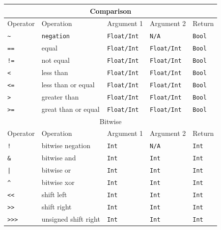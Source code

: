 \documentclass{article}
\newcommand{\type}[1]{\texttt{#1}}
\newcommand{\expr}[1]{\texttt{#1}}
\begin{document}
\begin{center}
\begin{tabular}{| l | l | l | l | l |}
	\multicolumn{5}{|c|}{Comparison} \\ \hline
	Operator & Operation & Argument 1 & Argument 2 & Return \\ \hline
	\expr{\textasciitilde} & \type{negation} & \type{Float/Int} & \type{N/A} & \type{Bool} \\
	\expr{==} & equal & \type{Float/Int} & \type{Float/Int} & \type{Bool} \\
	\expr{!=} & not equal & \type{Float/Int} & \type{Float/Int} & \type{Bool} \\
	\expr{<} & less than & \type{Float/Int} & \type{Float/Int} & \type{Bool} \\
	\expr{<=} & less than or equal & \type{Float/Int} & \type{Float/Int} & \type{Bool} \\
	\expr{>} & greater than & \type{Float/Int} & \type{Float/Int} & \type{Bool} \\
	\expr{>=} & great than or equal & \type{Float/Int} & \type{Float/Int} & \type{Bool} \\ \hline
	\multicolumn{5}{|c|}{Bitwise} \\ \hline
	Operator & Operation & Argument 1 & Argument 2 & Return \\ \hline
	\expr{!} & bitwise negation & \type{Int} & \type{N/A} & \type{Int} \\	
	\expr{\&} & bitwise and & \type{Int} & \type{Int} & \type{Int} \\	
	\expr{|} & bitwise or & \type{Int} & \type{Int} & \type{Int} \\	
	\expr{\^} & bitwise xor & \type{Int} & \type{Int} & \type{Int} \\	
	\expr{<<} & shift left & \type{Int} & \type{Int} & \type{Int} \\
	\expr{>>} & shift right & \type{Int} & \type{Int} & \type{Int} \\
	\expr{>>>} & unsigned shift right & \type{Int} & \type{Int} & \type{Int} \\ \hline
\end{tabular}
\end{center}
\end{document}
